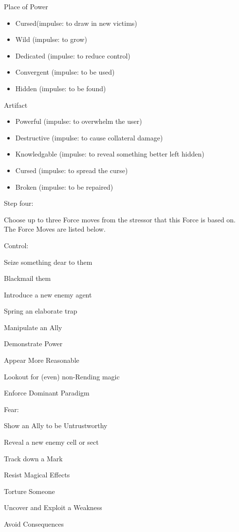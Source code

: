 \documentclass[
  oneside,
  statementpaper,
  9pt]{memoir}
\begin{document}
Place of Power

\begin{itemize}
\item
  Cursed(impulse: to draw in new victims)
\item
  Wild (impulse: to grow)
\item
  Dedicated (impulse: to reduce control)
\item
  Convergent (impulse: to be used)
\item
  Hidden (impulse: to be found)
\end{itemize}

Artifact

\begin{itemize}
\item
  Powerful (impulse: to overwhelm the user)
\item
  Destructive (impulse: to cause collateral damage)
\item
  Knowledgable (impulse: to reveal something better left hidden)
\item
  Cursed (impulse: to spread the curse)
\item
  Broken (impulse: to be repaired)
\end{itemize}

Step four:

Choose up to three Force moves from the stressor that this Force is
based on. The Force Moves are listed below.

Control:

\begin{itemize*}

\item Seize something dear to them 
\item Blackmail them 
\item Introduce a new enemy agent 
\item Spring an elaborate trap 
\item Manipulate an Ally 
\item Demonstrate Power 
\item Appear More Reasonable 
\item Lookout for (even) non-Rending magic 
\item Enforce Dominant Paradigm 

\end{itemize*}

Fear:

\begin{itemize*}

\item Show an Ally to be Untrustworthy 
\item Reveal a new enemy cell or sect 
\item Track down a Mark 
\item Resist Magical Effects 
\item Torture Someone 
\item Uncover and Exploit a Weakness 
\item Avoid Consequences

\end{itemize*}
\end{document}
